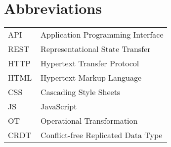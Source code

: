 \chapter*{Abbreviations}


\begin{flushleft}
\begin{tabular}{l p{0.8\linewidth}}
API      & Application Programming Interface\\
REST     & Representational State Transfer\\
HTTP     & Hypertext Transfer Protocol\\
HTML     & Hypertext Markup Language\\
CSS      & Cascading Style Sheets\\
JS       & JavaScript\\
OT       & Operational Transformation\\
CRDT     & Conflict-free Replicated Data Type\\
\end{tabular}
\end{flushleft}

